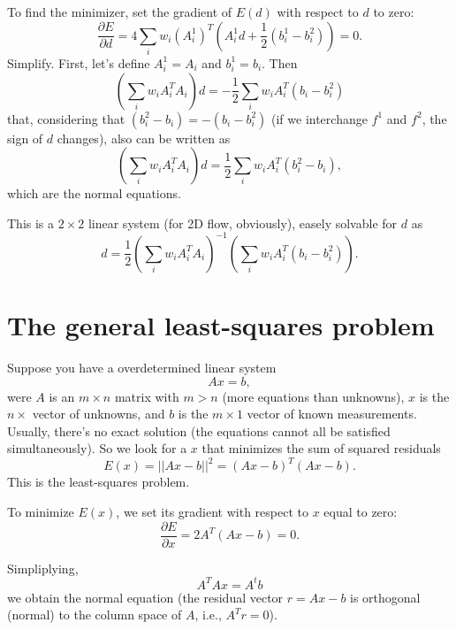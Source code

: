 To find the minimizer, set the gradient of $E(d)$ with respect to $d$ to zero:
\begin{equation}
  \frac{\partial E}{\partial d} = 4\sum_i w_i(A^1_i)^T\left(A^1_i d + \frac{1}{2}(b^1_i-b^2_i)\right) = 0.
\end{equation}
Simplify. First, let's define $A^1_i=A_i$ and $b^1_i=b_i$. Then
\begin{equation}
  \left( \sum_i w_iA_i^TA_i \right) d = -\frac{1}{2}\sum_i w_iA_i^T(b_i-b^2_i)
\end{equation}
that, considering that $(b^2_i - b_i) = -(b_i-b^2_i)$ (if we interchange $f^1$ and $f^2$, the sign of $d$ changes), also can be written as 
\begin{equation}
  \left( \sum_i w_iA_i^TA_i \right) d = \frac{1}{2}\sum_i w_iA_i^T(b^2_i-b_i),
\end{equation}
which are the normal equations.

This is a $2\times 2$ linear system (for 2D flow, obviously), easely solvable for $d$ as
\begin{equation}
  d = \frac{1}{2}\left( \sum_i w_iA_i^TA_i \right)^{-1}\left(\sum_i w_iA_i^T(b_i-b^2_i)\right).
\end{equation}


\section*{The general least-squares problem}
Suppose you have a overdetermined linear system
\begin{equation}
  Ax=b,
\end{equation}
were $A$ is an $m\times n$ matrix with $m>n$ (more equations than unknowns), $x$ is the $n\times $ vector of unknowns, and $b$ is the $m\times 1$ vector of known measurements. Usually, there's no exact solution (the equations cannot all be satisfied simultaneously). So we look for a $x$ that minimizes the sum of squared residuals
\begin{equation}
  E(x) = ||Ax-b||^2 = (Ax-b)^T(Ax-b).
\end{equation}
This is the least-squares problem.

To minimize $E(x)$, we set its gradient with respect to $x$ equal to zero:
\begin{equation}
  \frac{\partial E}{\partial x} = 2A^T(Ax-b) = 0.
\end{equation}

Simpliplying,
\begin{equation}
  A^TAx = A^tb
\end{equation}
we obtain the normal equation (the residual vector $r=Ax-b$ is orthogonal (normal) to the column space of $A$, i.e., $A^Tr=0$).


